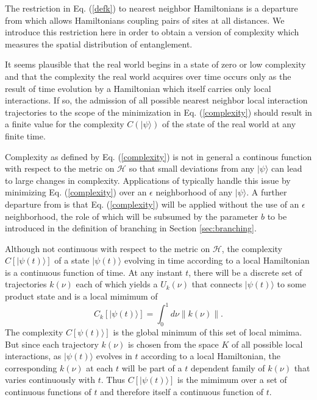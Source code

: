 \documentclass[12pt,amsmath,amssymb,onecolumn]{revtex4-2}
\begin{document}
The restriction in Eq. (\ref{defk}) to nearest neighbor Hamiltonians
is a departure from \cite{Nielsen} which allows Hamiltonians coupling
pairs of sites at all distances. 
We introduce this restriction here in order to obtain a version
of complexity which measures the spatial distribution of entanglement.

It seems plausible that the real world begins in a state of zero or low complexity
and that the complexity the real world acquires over time occurs
only as the result of time
evolution by a Hamiltonian which itself carries only  local interactions.
If so, the admission of all possible nearest neighbor local interaction trajectories
to the scope of the minimization in Eq. (\ref{complexity}) should result in a finite value for the
complexity $C( |\psi \rangle )$ of the state of the real world at any finite time.

Complexity as defined by Eq. (\ref{complexity})
is not in general a continous function with respect to the metric
on $\mathcal{H}$ so that small deviations from any $|\psi \rangle $ can lead
to large changes in complexity. Applications of \cite{Nielsen} typically
handle this issue by minimizing Eq. (\ref{complexity}) over an $\epsilon$
neighborhood of any $|\psi \rangle $.  A further departure from \cite{Nielsen}
is that Eq. (\ref{complexity}) will be applied without the
use of an $\epsilon$ neighborhood, the role of which
will be subsumed by the parameter $b$
to be introduced in the definition of branching
in Section \ref{sec:branching}.


Although not continuous with respect to the
metric on $\mathcal{H}$, the complexity $C[|\psi(t) \rangle ]$ of a state $|\psi(t) \rangle $
evolving in time according to a  local Hamiltonian
is a continuous function of time.  At any instant $t$, there will be a discrete set of trajectories
$k(\nu)$ each of  which yields a $U_k(\nu)$ that connects $|\psi(t) \rangle $ to some product state
and is a local mimimum of
\begin{equation}
  \label{integralnorm}
  C_k[ |\psi(t) \rangle ] = \int_0^1 d \nu \parallel k( \nu) \parallel.
\end{equation}
The complexity $C[ \psi(t) \rangle ]$ is the global minimum of this set of local mimima.
But since each trajectory $k(\nu)$ is chosen from the space $K$ of all possible
local interactions, as $|\psi(t) \rangle $ evolves in $t$ according to a  local Hamiltonian, the
corresponding $k(\nu)$ at each $t$ will be part of a $t$ dependent family
of $k(\nu)$ that varies continuously with $t$.
Thus $C[|\psi(t) \rangle ]$ is the mimimum over a set of continuous functions of $t$ and therefore itself
a continuous function of $t$.
\end{document}
